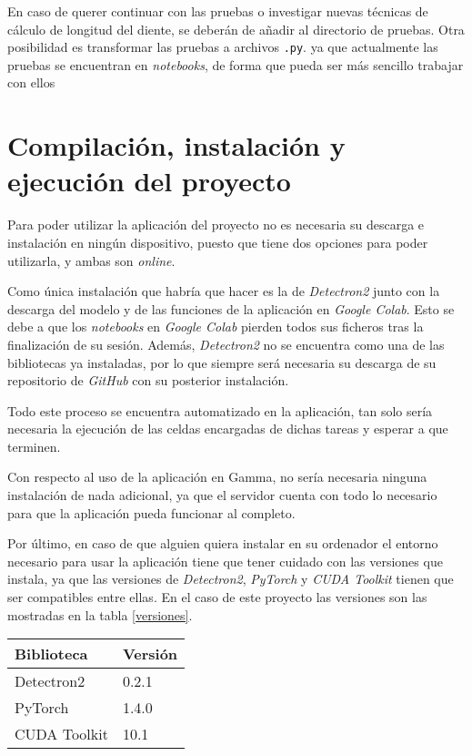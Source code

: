 En caso de querer continuar con las pruebas o investigar nuevas técnicas de cálculo de longitud del diente, se deberán de añadir al directorio de pruebas. Otra posibilidad es transformar las pruebas a archivos \texttt{.py}. ya que actualmente las pruebas se encuentran en \emph{notebooks}, de forma que pueda ser más sencillo trabajar con ellos

\section{Compilación, instalación y ejecución del proyecto}
Para poder utilizar la aplicación del proyecto no es necesaria su descarga e instalación en ningún dispositivo, puesto que tiene dos opciones para poder utilizarla, y ambas son \emph{online}.

Como única instalación que habría que hacer es la de \emph{Detectron2} junto con la descarga del modelo y de las funciones de la aplicación en \emph{Google Colab}. Esto se debe a que los \emph{notebooks} en \emph{Google Colab} pierden todos sus ficheros tras la finalización de su sesión. Además, \emph{Detectron2} no se encuentra como una de las bibliotecas ya instaladas, por lo que siempre será necesaria su descarga de su repositorio de \emph{GitHub} con su posterior instalación.

Todo este proceso se encuentra automatizado en la aplicación, tan solo sería necesaria la ejecución de las celdas encargadas de dichas tareas y esperar a que terminen.

Con respecto al uso de la aplicación en Gamma, no sería necesaria ninguna instalación de nada adicional, ya que el servidor cuenta con todo lo necesario para que la aplicación pueda funcionar al completo.

Por último, en caso de que alguien quiera instalar en su ordenador el entorno necesario para usar la aplicación tiene que tener cuidado con las versiones que instala, ya que las versiones de \emph{Detectron2}, \emph{PyTorch} y \emph{CUDA Toolkit} tienen que ser compatibles entre ellas. En el caso de este proyecto las versiones son las mostradas en la tabla \ref{versiones}.

\begin{center}
\begin{tabular}{|l|l|}
\hline
\textbf{Biblioteca} & \textbf{Versión} \\ \hline
Detectron2          & 0.2.1            \\ \hline
PyTorch             & 1.4.0            \\ \hline
CUDA Toolkit        & 10.1             \\ \hline
\end{tabular}
\label{versiones}
\end{center}

